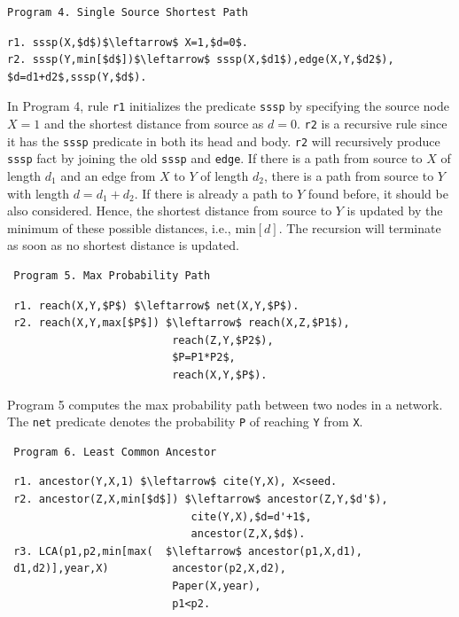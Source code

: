 \begin{appendix}
\begin{verbatim}
Program 4. Single Source Shortest Path
\end{verbatim}
\vspace{-0.1in}
\small
\begin{lstlisting}
r1. sssp(X,$d$)$\leftarrow$ X=1,$d=0$.
r2. sssp(Y,min[$d$])$\leftarrow$ sssp(X,$d1$),edge(X,Y,$d2$),
$d=d1+d2$,sssp(Y,$d$).
\end{lstlisting}
\normalsize

In Program 4, rule \texttt{r1} initializes the predicate \texttt{sssp} by specifying the source node $X=1$ and the shortest distance from source as $d=0$. \texttt{r2} is a recursive rule since it has the \texttt{sssp} predicate in both its head and body. \texttt{r2} will recursively produce \texttt{sssp} fact by joining the old \texttt{sssp} and \texttt{edge}. If there is a path from source to $X$ of length $d_1$ and an edge from $X$ to $Y$ of length $d_2$, there is a path from source to $Y$ with length $d=d_1+d_2$. If there is already a path to $Y$ found before, it should be also considered. Hence, the shortest distance from source to $Y$ is updated by the minimum of these possible distances, i.e., min$[d]$. The recursion will terminate as soon as no shortest distance is updated.
 
 
 \begin{verbatim}
 Program 5. Max Probability Path
 \end{verbatim}\vspace{-0.1in}\small
 \begin{lstlisting}
 r1. reach(X,Y,$P$) $\leftarrow$ net(X,Y,$P$).
 r2. reach(X,Y,max[$P$]) $\leftarrow$ reach(X,Z,$P1$),
                          reach(Z,Y,$P2$),
                          $P=P1*P2$,
                          reach(X,Y,$P$).
 \end{lstlisting}
 \normalsize
 
 Program 5 \cite{7113340} computes the max probability path between two nodes in a network. The \texttt{net} predicate denotes the probability \texttt{P} of reaching \texttt{Y} from \texttt{X}.
 
 \begin{verbatim}
 Program 6. Least Common Ancestor
 \end{verbatim}\small
 \begin{lstlisting}
 r1. ancestor(Y,X,1) $\leftarrow$ cite(Y,X), X<seed.
 r2. ancestor(Z,X,min[$d$]) $\leftarrow$ ancestor(Z,Y,$d'$),
                             cite(Y,X),$d=d'+1$,
                             ancestor(Z,X,$d$).
 r3. LCA(p1,p2,min[max(  $\leftarrow$ ancestor(p1,X,d1),
 d1,d2)],year,X)          ancestor(p2,X,d2),
                          Paper(X,year),
                          p1<p2.
 \end{lstlisting}
 \normalsize
 

\end{appendix}
